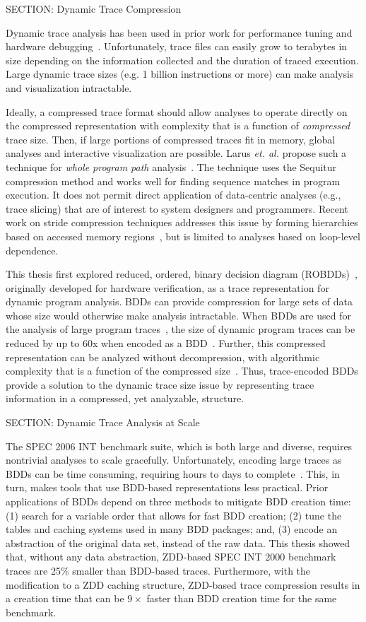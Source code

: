 {SECTION: Dynamic Trace Compression


Dynamic trace analysis has been used in prior work for performance tuning and hardware debugging~\cite{wu:94:micro}. Unfortunately, trace files can easily grow to terabytes in size depending on the information collected and the duration of traced execution.  Large dynamic trace sizes (e.g. 1 billion instructions or more) can make analysis and visualization intractable.

Ideally, a compressed trace format should allow analyses to operate directly on the compressed representation with complexity that is a function of \textit{compressed} trace size.  Then, if large portions of compressed traces fit in memory, global analyses and interactive visualization are possible.  Larus \textit{et. al.} propose such a technique for \textit{whole program path} analysis~\cite{larus:99:pldi}. The technique uses the Sequitur compression method and works well for finding sequence matches in program execution.  It does not permit direct application of data-centric analyses (e.g., trace slicing) that are of interest to system designers and programmers. Recent work on stride compression techniques addresses this issue by forming hierarchies based on accessed memory regions~\cite{minjang:10:micro}, but is limited to analyses based on loop-level dependence.

This thesis first explored reduced, ordered, binary decision diagram (ROBDDs)~\cite{bryant:86:ieeetc}, originally developed for hardware verification, as a trace representation for dynamic program analysis. BDDs can provide compression for large sets of data whose size would otherwise make analysis intractable. When BDDs are used for the analysis of large program traces~\cite{price:06:cal,price:08:pact,zhang:04:icse}, the size of dynamic program traces can be reduced by up to 60x when encoded as a BDD~\cite{price:06:cal}.  Further, this compressed representation can be analyzed without decompression, with algorithmic complexity that is a function of the compressed size~\cite{price:06:cal}.  Thus, trace-encoded BDDs provide a solution to the dynamic trace size issue by representing trace information in a compressed, yet analyzable, structure.

SECTION: Dynamic Trace Analysis at Scale


The SPEC 2006 INT benchmark suite, which is both large and diverse, requires nontrivial analyses to scale gracefully.  Unfortunately, encoding large traces as BDDs can be time consuming, requiring hours to days to complete~\cite{price:08:msthesis}.  This, in turn, makes tools that use BDD-based representations less practical.  Prior applications of BDDs depend on three methods to mitigate BDD creation time: (1) search for a variable order that allows for fast BDD creation; (2) tune the tables and caching systems used in many BDD packages; and, (3) encode an abstraction of the original data set, instead of the raw data.  This thesis showed that, without any data abstraction, ZDD-based SPEC INT 2000 benchmark traces are 25\% smaller than BDD-based traces.  Furthermore, with the modification to a ZDD caching structure, ZDD-based trace compression results in a creation time that can be $9\times$ faster than BDD creation time for the same benchmark.

}
